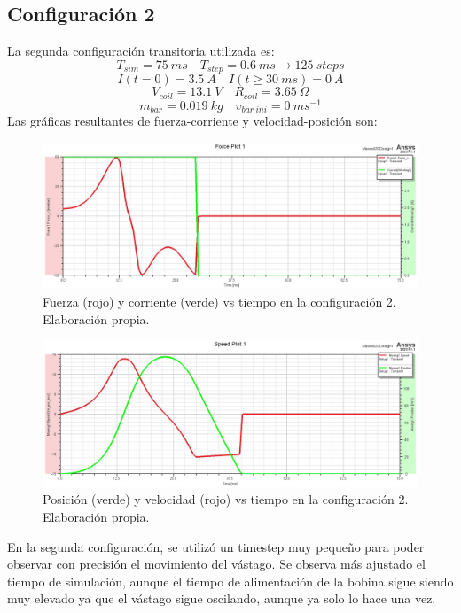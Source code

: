 \subsection*{Configuración 2}
La segunda configuración transitoria utilizada es:
\[
T_{sim}=75~ms \quad T_{step}=0.6~ms \to 125~steps
\]
\[
I(t=0)=3.5~A \quad I(t\geq 30~ms)=0~A
\]
\[
V_{coil}=13.1~V \quad R_{coil}=3.65~\Omega
\]
\[
m_{bar}=0.019~kg \quad v_{bar~ini}=0~ms^{-1}
\]
Las gráficas resultantes de fuerza-corriente y velocidad-posición son:
\begin{figure}[H]
    \centering
    \includegraphics[width=13cm]{FigurasMemoria/S2ForceCurrent.jpg}
    \caption{Fuerza (rojo) y corriente (verde) vs tiempo en la configuración 2. Elaboración propia.}
    \label{fig:S2ForceCurrent} %
\end{figure}
\begin{figure}[H]
    \centering
    \includegraphics[width=13cm]{FigurasMemoria/S2SpeedPosition.jpg}
    \caption{Posición (verde) y velocidad (rojo) vs tiempo en la configuración 2. Elaboración propia.}
    \label{fig:S2SpeedPosition} %
\end{figure}
En la segunda configuración, se utilizó un timestep muy pequeño para poder observar con precisión el movimiento del vástago. Se observa más ajustado el tiempo de simulación, aunque el tiempo de alimentación de la bobina sigue siendo muy elevado ya que el vástago sigue oscilando, aunque ya solo lo hace una vez. 

